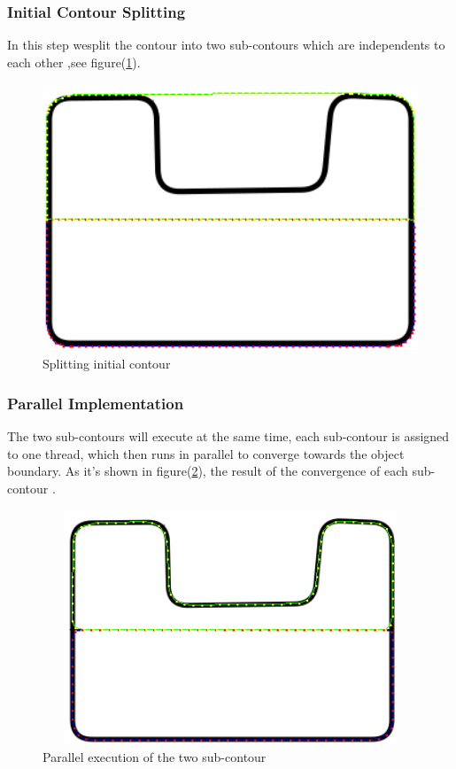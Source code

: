 \subsubsection{Initial Contour Splitting}
In this step wesplit the contour into two sub-contours which are independents to
each other ,see figure(\ref{fig:figure3.7}).

\begin{figure}[ht!]
    \centering
    \includegraphics[width=12cm,height=8cm]{chapiter3/figures/figure 11 b.png}
    \setlength{\fboxrule}{2pt}
    \caption{Splitting initial contour}
    \label{fig:figure3.7}
\end{figure}

\subsubsection{Parallel Implementation}
The two sub-contours will execute at the same time, each sub-contour is assigned to
one thread, which then runs in parallel to converge towards the object boundary. As
it's shown in figure(\ref{fig:figure3.8}), the result of the convergence of each sub-contour .

\begin{figure}[H]
    \centering
    \includegraphics[width=12cm,height=7cm]{chapiter3/figures/FIG7.png}
    \setlength{\fboxrule}{2pt}
    \caption{Parallel execution of the two sub-contour}
    \label{fig:figure3.8}
\end{figure}

